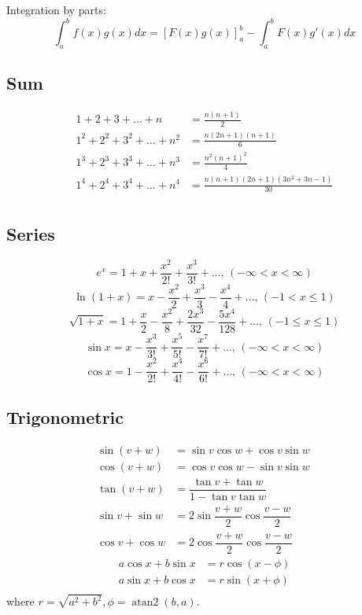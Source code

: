 \documentclass[a4paper, 12pt, oneside, landscape]{article}
\begin{document}
\begin{multicols}{2}
    Integration by parts:
    \[\int_a^bf(x)g(x)dx = [F(x)g(x)]_a^b-\int_a^bF(x)g'(x)dx\]	
	
	\subsection{Sum}
	\begin{align*}
    	1 + 2 + 3 + \dots + n &= \frac{n(n+1)}{2} \\
    	1^2 + 2^2 + 3^2 + \dots + n^2 &= \frac{n(2n+1)(n+1)}{6} \\
    	1^3 + 2^3 + 3^3 + \dots + n^3 &= \frac{n^2(n+1)^2}{4} \\
    	1^4 + 2^4 + 3^4 + \dots + n^4 &= \frac{n(n+1)(2n+1)(3n^2 + 3n - 1)}{30} \\
    \end{align*}
    
    \subsection{Series}
    $$e^x = 1+x+\frac{x^2}{2!}+\frac{x^3}{3!}+\dots,\,(-\infty<x<\infty)$$
    $$\ln(1+x) = x-\frac{x^2}{2}+\frac{x^3}{3}-\frac{x^4}{4}+\dots,\,(-1<x\leq1)$$
    $$\sqrt{1+x} = 1+\frac{x}{2}-\frac{x^2}{8}+\frac{2x^3}{32}-\frac{5x^4}{128}+\dots,\,(-1\leq x\leq1)$$
    $$\sin x = x-\frac{x^3}{3!}+\frac{x^5}{5!}-\frac{x^7}{7!}+\dots,\,(-\infty<x<\infty)$$
    $$\cos x = 1-\frac{x^2}{2!}+\frac{x^4}{4!}-\frac{x^6}{6!}+\dots,\,(-\infty<x<\infty)$$
    
    \subsection{Trigonometric}
    \begin{align*}
        \sin(v+w)&= \sin v\cos w+\cos v\sin w \\
        \cos(v+w)&=\cos v\cos w-\sin v\sin w\ \\
        \tan(v+w)&=\dfrac{\tan v+\tan w}{1-\tan v\tan w} \\
        \sin v+\sin w&=2\sin\dfrac{v+w}{2}\cos\dfrac{v-w}{2} \\
        \cos v+\cos w&=2\cos\dfrac{v+w}{2}\cos\dfrac{v-w}{2} 
    \end{align*}
    \begin{align*}
        a\cos x+b\sin x&=r\cos(x-\phi)\\
        a\sin x+b\cos x&=r\sin(x+\phi)\\
    \end{align*}
    where $r=\sqrt{a^2+b^2}, \phi=\operatorname{atan2}(b,a)$.


\end{multicols}
\end{document}
